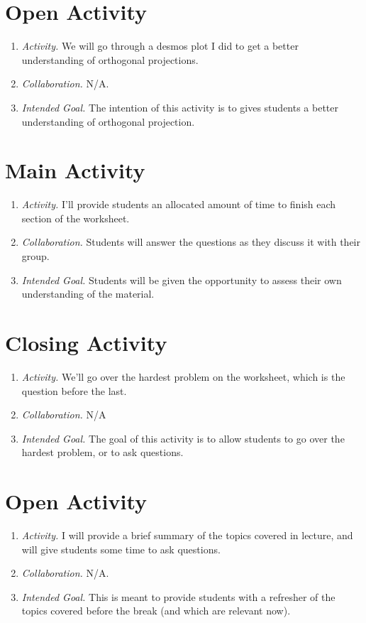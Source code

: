 \documentclass[11pt]{article}
\begin{document}
\newpage
{}
\section{\centering Open Activity}
	\begin{enumerate}
		\item \textit{Activity.} We will go through a desmos plot I did to get a better understanding of orthogonal projections.
		\item \textit{Collaboration.} N/A.
		\item \textit{Intended Goal.} The intention of this activity is to gives students a better understanding of orthogonal projection.
	\end{enumerate}

\section{\centering Main Activity}
	\begin{enumerate}
		\item \textit{Activity.} I'll provide students an allocated amount of time to finish each section of the worksheet.
		\item \textit{Collaboration.} Students will answer the questions as they discuss it with their group.
		\item \textit{Intended Goal.} Students will be given the opportunity to assess their own understanding of the material.
	\end{enumerate}
\section{\centering Closing Activity}
	\begin{enumerate}
		\item \textit{Activity.} We'll go over the hardest problem on the worksheet, which is the question before the last.
		\item \textit{Collaboration.} N/A
		\item \textit{Intended Goal.} The goal of this activity is to allow students to go over the hardest problem, or to ask questions.
	\end{enumerate}

\newpage
{}
\section{\centering Open Activity}
	\begin{enumerate}
		\item \textit{Activity.} I will provide a brief summary of the topics covered in lecture, and will give students some time to ask questions.
		\item \textit{Collaboration.} N/A.
		\item \textit{Intended Goal.} This is meant to provide students with a refresher of the topics covered before the break (and which are relevant now).
	\end{enumerate}
\end{document}
